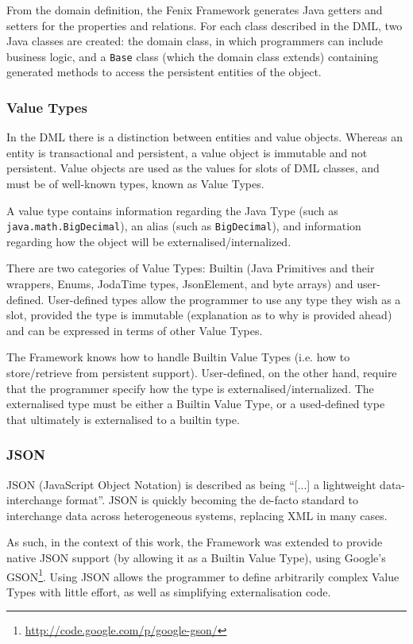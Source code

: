 \documentclass{llncs}
\begin{document}
From the domain definition, the Fenix Framework generates Java getters
and setters for the properties and relations. For each class described
in the DML, two Java classes are created: the domain class, in which
programmers can include business logic, and a \texttt{Base} class
(which the domain class extends) containing generated methods to
access the persistent entities of the object.

\subsubsection{Value Types}

In the DML there is a distinction between entities and value
objects. Whereas an entity is transactional and persistent, a value
object is immutable and not persistent. Value objects are used as the
values for slots of DML classes, and must be of well-known types,
known as Value Types.

A value type contains information regarding the Java Type (such as
\texttt{java.math.BigDecimal}), an alias (such as
\texttt{BigDecimal}), and information regarding how the object will be
externalised/internalized.

There are two categories of Value Types: Builtin (Java Primitives and
their wrappers, Enums, JodaTime types, JsonElement, and byte arrays)
and user-defined. User-defined types allow the programmer to use any
type they wish as a slot, provided the type is immutable (explanation
as to why is provided ahead) and can be expressed in terms of other
Value Types.

The Framework knows how to handle Builtin Value Types (i.e. how to
store/retrieve from persistent support). User-defined, on the other
hand, require that the programmer specify how the type is
externalised/internalized. The externalised type must be either a
Builtin Value Type, or a used-defined type that ultimately is
externalised to a builtin type.

\subsubsection{JSON}
\label{sec:json}

JSON (JavaScript Object Notation) is described as being ``[...] a
lightweight data-interchange format''. JSON is quickly becoming the
de-facto standard to interchange data across heterogeneous systems,
replacing XML in many cases.

As such, in the context of this work, the Framework was extended to
provide native JSON support (by allowing it as a Builtin Value Type),
using Google's GSON\footnote{\url{http://code.google.com/p/google-gson/}}.
Using JSON allows the programmer to define arbitrarily complex Value
Types with little effort, as well as simplifying externalisation code.
\end{document}
